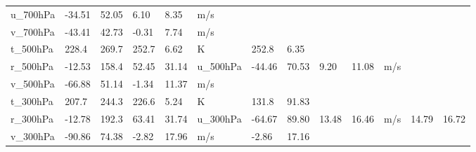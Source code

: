 \begin{table}[h]
\begin{tabular}{p{2.5cm}p{1.6cm}p{1.6cm}p{1.6cm}p{1.6cm}p{1.1cm}p{1.5cm}p{1.5cm}}
        u_700hPa & -34.51 & 52.05 & 6.10 & 8.35 & m/s &  &  \\
        v_700hPa & -43.41 & 42.73 & -0.31 & 7.74 & m/s &  &  \\
        t_500hPa & 228.4 & 269.7 & 252.7 & 6.62 & K & 252.8 & 6.35 \\
        r_500hPa & -12.53 & 158.4 & 52.45 & 31.14 & %
        u_500hPa & -44.46 & 70.53 & 9.20 & 11.08 & m/s &  &  \\
        v_500hPa & -66.88 & 51.14 & -1.34 & 11.37 & m/s &  &  \\
        t_300hPa & 207.7 & 244.3 & 226.6 & 5.24 & K & 131.8 & 91.83 \\
        r_300hPa & -12.78 & 192.3 & 63.41 & 31.74 & %
        u_300hPa & -64.67 & 89.80 & 13.48 & 16.46 & m/s & 14.79 & 16.72 \\
        v_300hPa & -90.86 & 74.38 & -2.82 & 17.96 & m/s & -2.86 & 17.16 \\
        \bottomrule
    \end{tabular}
    \label{tab:era5_all_channels}
\end{table}
